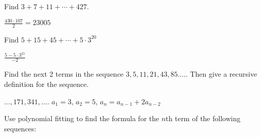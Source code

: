\begin{squestions}
\begin{answer}
  \end{answer}



\question Find $3 + 7 + 11+ \cdots + 427$.

  \begin{answer}
   $\frac{430\cdot 107}{2} = 23005$
  \end{answer}


\question Find $5 + 15 + 45 + \cdots + 5\cdot 3^{20}$

  \begin{answer}
   $\frac{5-5\cdot 3^{21}}{-2}$
  \end{answer}




\question Find the next 2 terms in the sequence $3, 5, 11, 21, 43, 85\ldots.$.  Then give a recursive definition for the sequence.

  \begin{answer}
   $\ldots, 171, 341,\ldots$.  $a_1 = 3$, $a_2 = 5$, $a_n = a_{n-1} + 2a_{n-2}$
  \end{answer}



\question Use polynomial fitting to find the formula for the $n$th term of the following sequences:

  \begin{answer}
\end{answer}
\end{squestions}
